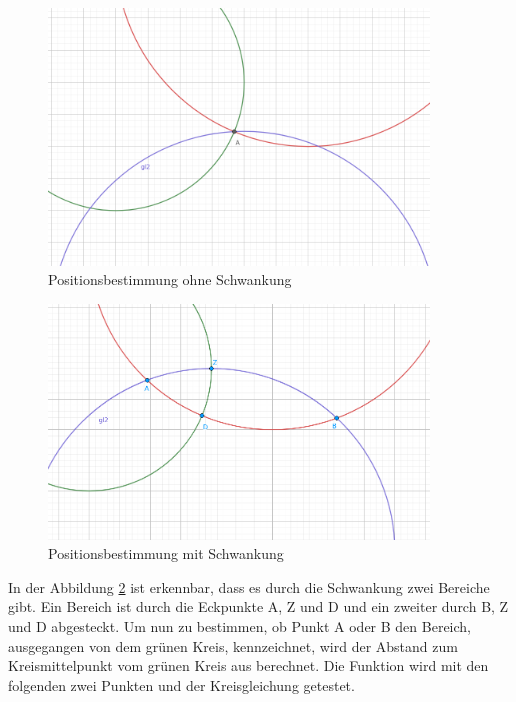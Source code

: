 \begin{figure}[H]
	\centering
	\includegraphics[width=0.9\textwidth]{images/picture_unit_test_calc_position_1.png}
	\caption{Positionsbestimmung ohne Schwankung}
	\label{img:figure_abstand_zweier_punkte}
\end{figure}

\begin{figure}[H]
	\centering
	\includegraphics[width=0.9\textwidth]{images/picture_unit_test_calc_position_2.png}
	\caption{Positionsbestimmung mit Schwankung}
	\label{img:figure_abstand_zweier_punkte}
\end{figure}
    
In der Abbildung \ref{img:figure_abstand_zweier_punkte} ist erkennbar, dass es durch die Schwankung zwei Bereiche gibt. Ein Bereich ist durch die Eckpunkte \si{A}, \si{Z} und \si{D} und ein zweiter durch \si{B}, \si{Z} und \si{D} abgesteckt. Um nun zu bestimmen, ob Punkt \si{A} oder \si{B} den Bereich, ausgegangen von dem grünen Kreis, kennzeichnet, wird der Abstand zum Kreismittelpunkt vom grünen Kreis aus berechnet. Die Funktion wird mit den folgenden zwei Punkten und der Kreisgleichung getestet.

